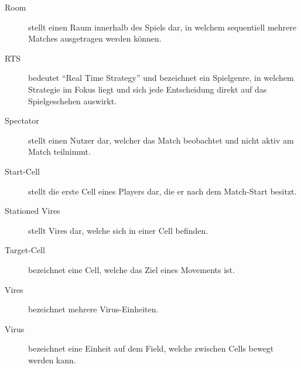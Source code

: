\begin{description}
	\item[Room] stellt einen Raum innerhalb des Spiels dar, in welchem sequentiell mehrere Matches ausgetragen werden können.
	\item[RTS] bedeutet ``Real Time Strategy'' und bezeichnet ein Spielgenre, in welchem Strategie im Fokus liegt und sich jede Entscheidung direkt auf das Spielgeschehen auswirkt.
	\item[Spectator] stellt einen Nutzer dar, welcher das Match beobachtet und nicht aktiv am Match teilnimmt.
	\item[Start-Cell] stellt die erste Cell eines Players dar, die er nach dem Match-Start besitzt.
	\item[Stationed Vires] stellt Vires dar, welche sich in einer Cell befinden.
	\item[Target-Cell] bezeichnet eine Cell, welche das Ziel eines Movements ist.
	\item[Vires] bezeichnet mehrere Virus-Einheiten.
	\item[Virus] bezeichnet eine Einheit auf dem Field, welche zwischen Cells bewegt werden kann.
\end{description}